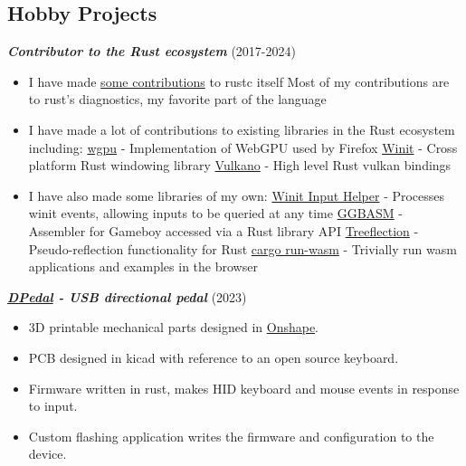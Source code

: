 \documentclass[line, resMargin, a4paper]{res}
\begin{document}
\begin{resume}
    \section{Hobby Projects}

    \textbf{\emph {Contributor to the Rust ecosystem}} (2017-2024)
    \begin{itemize}
        \item I have made \href{https://github.com/rust-lang/rust/pulls?q=author%3Arukai}{some contributions} to rustc itself
            \subitem Most of my contributions are to rust's diagnostics, my favorite part of the language
        \item I have made a lot of contributions to existing libraries in the Rust ecosystem including:
        \subitem \href{https://github.com/gfx-rs/wgpu/pulls?utf8=%E2%9C%93&q=author%3Arukai}{wgpu} - Implementation of WebGPU used by Firefox
        \subitem \href{https://github.com/rust-windowing/winit/pulls?utf8=%E2%9C%93&q=author%3Arukai+}{Winit} - Cross platform Rust windowing library
        \subitem \href{https://github.com/vulkano-rs/vulkano/pulls?utf8=%E2%9C%93&q=author%3Arukai}{Vulkano} - High level Rust vulkan bindings
        \item I have also made some libraries of my own:
        \subitem \href{https://github.com/rukai/winit_input_helper}{Winit Input Helper} - Processes winit events, allowing inputs to be queried at any time
        \subitem \href{https://github.com/rukai/ggbasm}{GGBASM} - Assembler for Gameboy accessed via a Rust library API
        \subitem \href{https://github.com/rukai/treeflection}{Treeflection} - Pseudo-reflection functionality for Rust
        \subitem \href{https://github.com/rukai/cargo-run-wasm}{cargo run-wasm} - Trivially run wasm applications and examples in the browser
    \end{itemize}

    \textbf{\emph {\href{https://github.com/rukai/DPedal}{DPedal} - USB directional pedal}} (2023)
    \begin{itemize}
        \item 3D printable mechanical parts designed in \href{https://cad.onshape.com/documents/b3650977a607511c32026f52/w/79027c5ddd8ad99ee7db1e2a/e/7192077cb58abe7f31bd20c3?renderMode=0&uiState=63ad8d5084623c01cce27891}{Onshape}.
        \item PCB designed in kicad with reference to an open source keyboard.
        \item Firmware written in rust, makes HID keyboard and mouse events in response to input.
        \item Custom flashing application writes the firmware and configuration to the device.
    \end{itemize}


\end{resume}
\end{document}
